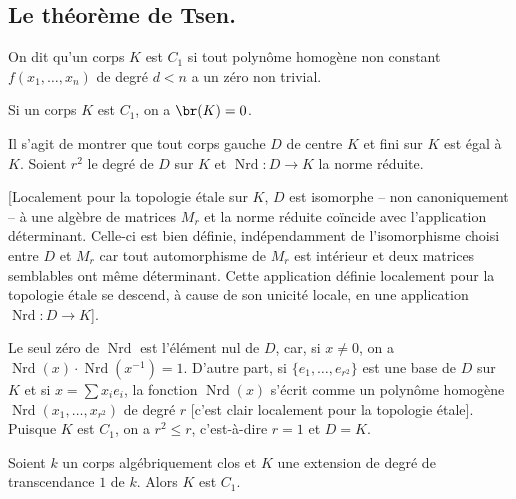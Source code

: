 \subsection{Le théorème de Tsen.}\label{I:3-2}





\begin{definitiondotdash}\label{I:3-2-1}
On dit qu'un corps $K$ est $C_1$ si tout polynôme homogène non constant 
$f(x_1,\dotsc,x_n)$ de degré $d<n$ a un zéro non trivial.
\end{definitiondotdash}





\begin{propositiondotdash}\label{I:3-2-2}
Si un corps $K$ est $C_1$, on a $\br(K)=0$.
\end{propositiondotdash}

Il s'agit de montrer que tout corps gauche $D$ de centre $K$ et fini sur $K$ 
est égal à $K$. Soient $r^2$ le degré de $D$ sur $K$ et 
$\operatorname{Nrd}:D\to K$ la norme réduite. 

[Localement pour la topologie étale sur $K$, $D$ est isomorphe -- non 
canoniquement -- à une algèbre de matrices $M_r$ et la norme réduite 
coïncide avec l'application déterminant. Celle-ci est bien définie, 
indépendamment de l'isomorphisme choisi entre $D$ et $M_r$ car tout 
automorphisme de $M_r$ est intérieur et deux matrices semblables ont 
même déterminant. Cette application définie localement pour la 
topologie étale se descend, à cause de son unicité locale, en une 
application $\operatorname{Nrd}:D\to K$]. 

Le seul zéro de $\operatorname{Nrd}$ est l'élément nul de $D$, car, si 
$x\ne 0$, on a $\operatorname{Nrd}(x)\cdot \operatorname{Nrd}(x^{-1}) = 1$. 
D'autre part, si $\{e_1,\dotsc,e_{r^2}\}$ est une base de $D$ sur $K$ et si 
$x=\sum x_i e_i$, la fonction $\operatorname{Nrd}(x)$ s'écrit comme un polynôme 
homogène $\operatorname{Nrd}(x_1,\dotsc,x_{r^2})$ de degré $r$ [c'est 
clair localement pour la topologie étale]. Puisque $K$ est $C_1$, on a 
$r^2\leqslant r$, c'est-à-dire $r=1$ et $D=K$. 





\begin{theoremdotdash}[Tsen]\label{I:3-2-3}
Soient $k$ un corps algébriquement clos et $K$ une extension de degré de 
transcendance $1$ de $k$. Alors $K$ est $C_1$.
\end{theoremdotdash}

